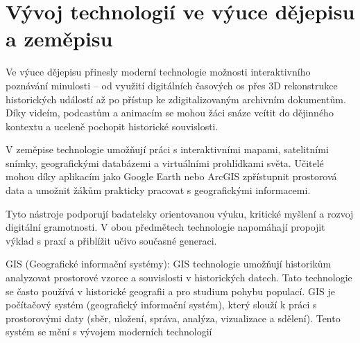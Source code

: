 \documentclass[a4paper,12pt,twoside,FP]{article}
\begin{document}
\section{Vývoj technologií ve výuce dějepisu a zeměpisu}
Ve výuce dějepisu přinesly moderní technologie možnosti interaktivního poznávání minulosti – od využití digitálních časových os přes 3D rekonstrukce historických událostí až po přístup ke zdigitalizovaným archivním dokumentům. Díky videím, podcastům a animacím se mohou žáci snáze vcítit do dějinného kontextu a uceleně pochopit historické souvislosti.

V zeměpise technologie umožňují práci s interaktivními mapami, satelitními snímky, geografickými databázemi a virtuálními prohlídkami světa. Učitelé mohou díky aplikacím jako Google Earth nebo ArcGIS zpřístupnit prostorová data a umožnit žákům prakticky pracovat s geografickými informacemi.

Tyto nástroje podporují badatelsky orientovanou výuku, kritické myšlení a rozvoj digitální gramotnosti. V obou předmětech technologie napomáhají propojit výklad s praxí a přiblížit učivo současné generaci.

GIS (Geografické informační systémy): GIS technologie umožňují historikům analyzovat prostorové vzorce a souvislosti v historických datech. Tato technologie se často používá v historické geografii a pro studium pohybu populací. GIS je počítačový systém (geografický informační systém), který slouží k práci s prostorovými daty (sběr, uložení, správa, analýza, vizualizace a sdělení). Tento systém se mění s vývojem moderních technologií
\end{document}
